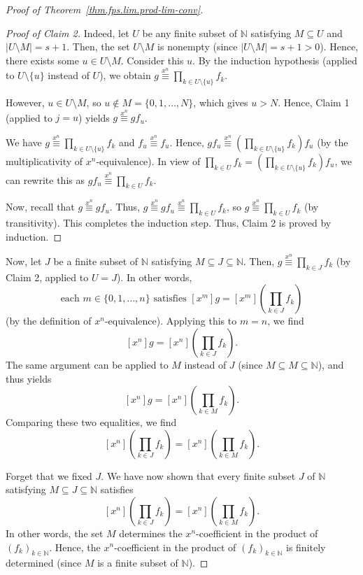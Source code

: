 \begin{proof}[Proof of Theorem~\ref{thm.fps.lim.prod-lim-conv}]
\begin{proof}[Proof of Claim 2]
Indeed, let $U$ be any finite subset of $\mathbb{N}$ satisfying
$M\subseteq U$ and $|U\setminus M| = s+1$. Then, the set
$U\setminus M$ is nonempty (since $|U\setminus M| = s+1 > 0$). Hence,
there exists some $u\in U\setminus M$. Consider this $u$. By the
induction hypothesis (applied to $U\setminus\{u\}$ instead of $U$), we
obtain $g \overset{x^n}{\equiv} \prod_{k\in U\setminus\{u\}} f_k$.

However, $u\in U\setminus M$, so $u\notin M = \{0,1,\ldots,N\}$, which
gives $u > N$. Hence, Claim 1 (applied to $j = u$) yields
$g \overset{x^n}{\equiv} g f_u$.

We have $g \overset{x^n}{\equiv} \prod_{k\in U\setminus\{u\}} f_k$ and
$f_u \overset{x^n}{\equiv} f_u$. Hence,
$g f_u \overset{x^n}{\equiv} \left(\prod_{k\in U\setminus\{u\}} f_k\right) f_u$
(by the multiplicativity of $x^n$-equivalence). In view of
$\prod_{k\in U} f_k = \left(\prod_{k\in U\setminus\{u\}} f_k\right) f_u$,
we can rewrite this as
$g f_u \overset{x^n}{\equiv} \prod_{k\in U} f_k$.

Now, recall that $g \overset{x^n}{\equiv} g f_u$. Thus,
$g \overset{x^n}{\equiv} g f_u \overset{x^n}{\equiv} \prod_{k\in U} f_k$,
so $g \overset{x^n}{\equiv} \prod_{k\in U} f_k$ (by transitivity).
This completes the induction step. Thus, Claim 2 is proved by induction.
\end{proof}

Now, let $J$ be a finite subset of $\mathbb{N}$ satisfying
$M\subseteq J\subseteq\mathbb{N}$. Then,
$g \overset{x^n}{\equiv} \prod_{k\in J} f_k$ (by Claim 2, applied to
$U = J$). In other words,
\[
\text{each } m\in\{0,1,\ldots,n\} \text{ satisfies }
[x^m] g = [x^m]\left(\prod_{k\in J} f_k\right)
\]
(by the definition of $x^n$-equivalence). Applying this to $m = n$, we
find
\[
[x^n] g = [x^n]\left(\prod_{k\in J} f_k\right).
\]
The same argument can be applied to $M$ instead of $J$ (since
$M\subseteq M\subseteq\mathbb{N}$), and thus yields
\[
[x^n] g = [x^n]\left(\prod_{k\in M} f_k\right).
\]
Comparing these two equalities, we find
\[
[x^n]\left(\prod_{k\in J} f_k\right)
= [x^n]\left(\prod_{k\in M} f_k\right).
\]

Forget that we fixed $J$. We have now shown that every finite subset $J$
of $\mathbb{N}$ satisfying $M\subseteq J\subseteq\mathbb{N}$ satisfies
\[
[x^n]\left(\prod_{k\in J} f_k\right)
= [x^n]\left(\prod_{k\in M} f_k\right).
\]
In other words, the set $M$ determines the $x^n$-coefficient in the
product of $(f_k)_{k\in\mathbb{N}}$. Hence, the $x^n$-coefficient in
the product of $(f_k)_{k\in\mathbb{N}}$ is finitely determined (since
$M$ is a finite subset of $\mathbb{N}$).


\end{proof}
